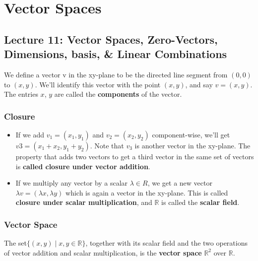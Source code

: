 \documentclass[oneside]{book}
\begin{document}
\chapter{Vector Spaces}
\section{Lecture 11: Vector Spaces, Zero-Vectors, Dimensions, basis, \& Linear Combinations}



We define a vector v in the xy-plane to be the directed line segment from $(0, 0) $to $(x, y)$. We’ll identify this vector with the point $(x, y)$, and say $v = (x, y)$. The entries $x$, $y$ are called the \textbf{components} of the vector.

\subsection{Closure}
\begin{itemize}
    \item If we add $v_1 = (x_1, y_1)$ and $v_2 = (x_2, y_2)$ component-wise, we’ll get $v3 = (x_1 + x_2, y_1 + y_2)$. Note that $v_3$ is another vector in the xy-plane. The property that adds two vectors to get a third vector in the same set of vectors is \textbf{called closure under vector addition}.
    \item If we multiply any vector by a scalar $\lambda \in R$, we get a new vector $\lambda v = (\lambda x, \lambda y)$ which is again a vector in the xy-plane. This is called \textbf{closure under scalar multiplication}, and $\mathbb{R}$ is called the \textbf{scalar field}.
\end{itemize}



\subsection{Vector Space}
The set$ \{(x, y)\mid x, y \in \mathbb{R}\}$, together with its scalar field and the two operations of vector addition and scalar multiplication, is the \textbf{vector space} $\mathbb{R}^2$ over $\mathbb{R}$.
\end{document}
